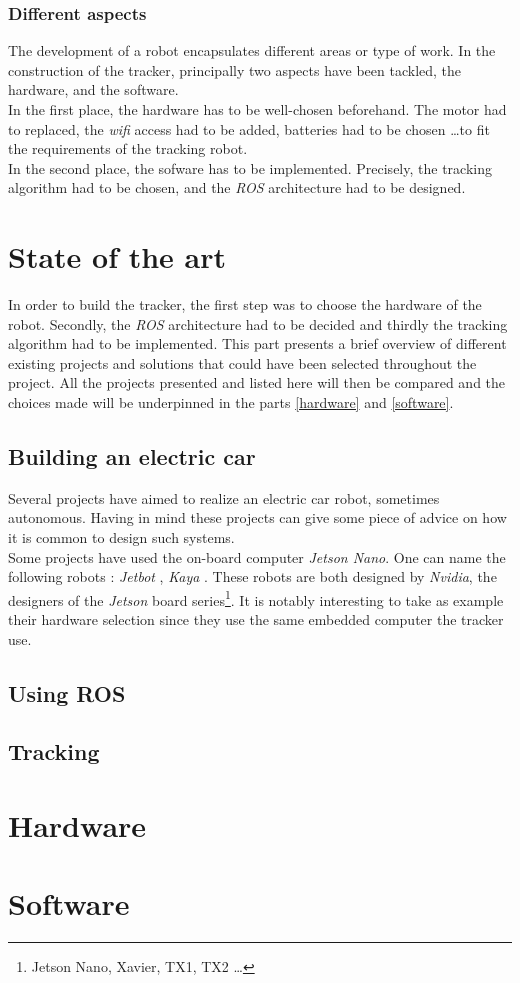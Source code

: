 		\subsection{Different aspects}

		The development of a robot encapsulates different areas or type of work.
		In the construction of the tracker, principally two aspects 
		have been tackled, the hardware, and the software.
		\\\indent In the first place, the hardware has to be well-chosen beforehand.
		The motor had to replaced, the \textit{wifi} access had to be added, batteries 
		had to be chosen \dots to fit the requirements of the tracking robot.
		\\\indent In the second place, the sofware has to be implemented. Precisely, 
		the tracking algorithm had to be chosen, and the \textit{ROS} architecture had 
		to be designed.
		
\chapter{State of the art}

		In order to build the tracker, the first step was to choose the
		hardware of the robot. Secondly, the \textit{ROS} architecture had to be decided
		and thirdly the tracking algorithm had to be implemented. This part 
		presents a brief overview of different existing projects and solutions 
		that could have been selected throughout the project. All the projects
		presented and listed here will then be compared and the choices
		made will be underpinned in the parts \vref{hardware} and \vref{software}.
		
		\section{Building an electric car}
		
		Several projects have aimed to realize an electric car robot, sometimes autonomous. 
		Having in mind these projects can give some piece of advice on how it is common 
		to design such systems.
		\\\indent Some projects have used the on-board computer \textit{Jetson Nano}. 
		One can name the following robots : \textit{Jetbot} \cite{jetbot}, \textit{Kaya} \cite{kaya}.
		These robots are both designed by \textit{Nvidia}, the designers of the 
		\textit{Jetson} board series\footnote{Jetson Nano, Xavier, TX1, TX2 \dots}. It 
		is notably interesting to take as example their hardware selection since they
		use the same embedded computer the tracker use.
		
		\section{Using ROS}
		
		
		
		\section{Tracking}
		
		
\chapter{Hardware}\label{hardware}

\chapter{Software}\label{software}